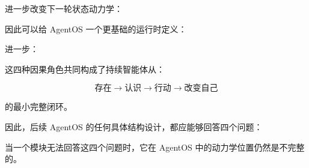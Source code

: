 进一步改变下一轮状态动力学：

\begin{statementbox}
\centering
{}
\end{statementbox}

因此可以给 AgentOS 一个更基础的运行时定义：

\begin{statementbox}
\centering
{}
\end{statementbox}

进一步：

\begin{statementbox}
\centering
{}
\end{statementbox}

这四种因果角色共同构成了持续智能体从：

\[
\text{存在}
\rightarrow
\text{认识}
\rightarrow
\text{行动}
\rightarrow
\text{改变自己}
\]

的最小完整闭环。

因此，后续 AgentOS 的任何具体结构设计，都应能够回答四个问题：

\begin{statementbox}
\centering
{}
\end{statementbox}

\begin{statementbox}
\centering
{}
\end{statementbox}

\begin{statementbox}
\centering
{}
\end{statementbox}

\begin{statementbox}
\centering
{}
\end{statementbox}

当一个模块无法回答这四个问题时，它在 AgentOS 中的动力学位置仍然是不完整的。
